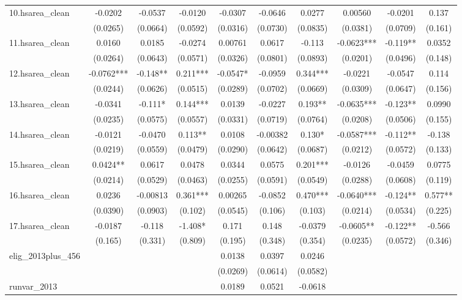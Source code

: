 \documentclass[]{article}
\begin{document}
\begin{tabular}{lccccccccc}
10.hsarea\_clean & -0.0202 & -0.0537 & -0.0120 & -0.0307 & -0.0646 & 0.0277 & 0.00560 & -0.0201 & 0.137 \\
 & (0.0265) & (0.0664) & (0.0592) & (0.0316) & (0.0730) & (0.0835) & (0.0381) & (0.0709) & (0.161) \\
11.hsarea\_clean & 0.0160 & 0.0185 & -0.0274 & 0.00761 & 0.0617 & -0.113 & -0.0623*** & -0.119** & 0.0352 \\
 & (0.0264) & (0.0643) & (0.0571) & (0.0326) & (0.0801) & (0.0893) & (0.0201) & (0.0496) & (0.148) \\
12.hsarea\_clean & -0.0762*** & -0.148** & 0.211*** & -0.0547* & -0.0959 & 0.344*** & -0.0221 & -0.0547 & 0.114 \\
 & (0.0244) & (0.0626) & (0.0515) & (0.0289) & (0.0702) & (0.0669) & (0.0309) & (0.0647) & (0.156) \\
13.hsarea\_clean & -0.0341 & -0.111* & 0.144*** & 0.0139 & -0.0227 & 0.193** & -0.0635*** & -0.123** & 0.0990 \\
 & (0.0235) & (0.0575) & (0.0557) & (0.0331) & (0.0719) & (0.0764) & (0.0208) & (0.0506) & (0.155) \\
14.hsarea\_clean & -0.0121 & -0.0470 & 0.113** & 0.0108 & -0.00382 & 0.130* & -0.0587*** & -0.112** & -0.138 \\
 & (0.0219) & (0.0559) & (0.0479) & (0.0290) & (0.0642) & (0.0687) & (0.0212) & (0.0572) & (0.133) \\
15.hsarea\_clean & 0.0424** & 0.0617 & 0.0478 & 0.0344 & 0.0575 & 0.201*** & -0.0126 & -0.0459 & 0.0775 \\
 & (0.0214) & (0.0529) & (0.0463) & (0.0255) & (0.0591) & (0.0549) & (0.0288) & (0.0608) & (0.119) \\
16.hsarea\_clean & 0.0236 & -0.00813 & 0.361*** & 0.00265 & -0.0852 & 0.470*** & -0.0640*** & -0.124** & 0.577** \\
 & (0.0390) & (0.0903) & (0.102) & (0.0545) & (0.106) & (0.103) & (0.0214) & (0.0534) & (0.225) \\
17.hsarea\_clean & -0.0187 & -0.118 & -1.408* & 0.171 & 0.148 & -0.0379 & -0.0605** & -0.122** & -0.566 \\
 & (0.165) & (0.331) & (0.809) & (0.195) & (0.348) & (0.354) & (0.0235) & (0.0572) & (0.346) \\
elig\_2013plus\_456 &  &  &  & 0.0138 & 0.0397 & 0.0246 &  &  &  \\
 &  &  &  & (0.0269) & (0.0614) & (0.0582) &  &  &  \\
runvar\_2013 &  &  &  & 0.0189 & 0.0521 & -0.0618 &  &  &  \\

\end{tabular}
\end{document}
